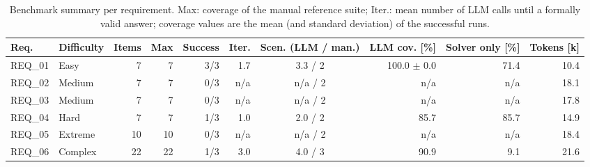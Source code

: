 \begin{table}[htbp]
  \centering
  \small
  \caption{Benchmark summary per requirement. Max: coverage of the manual reference suite; Iter.: mean number of LLM calls until a formally valid answer; coverage values are the mean (and standard deviation) of the successful runs.}
  \label{tab:benchmark-summary}
  \begin{tabular}{llrrrrcrrr}
    \toprule
    Req. & Difficulty & Items & Max & Success & Iter. & Scen. (LLM / man.) & LLM cov. [\%] & Solver only [\%] & Tokens [k] \\
    \midrule
    REQ\_01 & Easy & 7 & 7 & 3/3 & 1.7 & 3.3 / 2 & 100.0 $\pm$ 0.0 & 71.4 & 10.4 \\
    REQ\_02 & Medium & 7 & 7 & 0/3 & n/a & n/a / 2 & n/a & n/a & 18.1 \\
    REQ\_03 & Medium & 7 & 7 & 0/3 & n/a & n/a / 2 & n/a & n/a & 17.8 \\
    REQ\_04 & Hard & 7 & 7 & 1/3 & 1.0 & 2.0 / 2 & 85.7 & 85.7 & 14.9 \\
    REQ\_05 & Extreme & 10 & 10 & 0/3 & n/a & n/a / 2 & n/a & n/a & 18.4 \\
    REQ\_06 & Complex & 22 & 22 & 1/3 & 3.0 & 4.0 / 3 & 90.9 & 9.1 & 21.6 \\
    \bottomrule
  \end{tabular}
\end{table}
